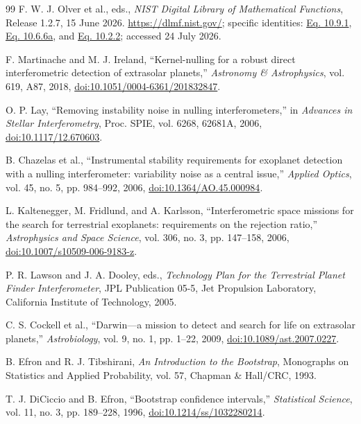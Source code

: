 \documentclass[12pt,a4paper]{article}
\numberwithin{equation}{section}
\numberwithin{figure}{section}
\numberwithin{table}{section}
\begin{document}
\begin{thebibliography}{99}
F. W. J. Olver et al., eds.,
\textit{NIST Digital Library of Mathematical Functions}, Release 1.2.7, 15 June 2026.
\url{https://dlmf.nist.gov/}; specific identities:
\href{https://dlmf.nist.gov/10.9.E1}{Eq. 10.9.1},
\href{https://dlmf.nist.gov/10.6.E6a}{Eq. 10.6.6a}, and
\href{https://dlmf.nist.gov/10.2.E2}{Eq. 10.2.2}; accessed 24 July 2026.

F. Martinache and M. J. Ireland,
``Kernel-nulling for a robust direct interferometric detection of extrasolar planets,''
\textit{Astronomy \& Astrophysics}, vol. 619, A87, 2018,
\href{https://doi.org/10.1051/0004-6361/201832847}{doi:10.1051/0004-6361/201832847}.

O. P. Lay,
``Removing instability noise in nulling interferometers,''
in \textit{Advances in Stellar Interferometry}, Proc. SPIE, vol. 6268, 62681A, 2006,
\href{https://doi.org/10.1117/12.670603}{doi:10.1117/12.670603}.

B. Chazelas et al.,
``Instrumental stability requirements for exoplanet detection with a nulling interferometer: variability noise as a central issue,''
\textit{Applied Optics}, vol. 45, no. 5, pp. 984--992, 2006,
\href{https://doi.org/10.1364/AO.45.000984}{doi:10.1364/AO.45.000984}.

L. Kaltenegger, M. Fridlund, and A. Karlsson,
``Interferometric space missions for the search for terrestrial exoplanets: requirements on the rejection ratio,''
\textit{Astrophysics and Space Science}, vol. 306, no. 3, pp. 147--158, 2006,
\href{https://doi.org/10.1007/s10509-006-9183-z}{doi:10.1007/s10509-006-9183-z}.

P. R. Lawson and J. A. Dooley, eds.,
\textit{Technology Plan for the Terrestrial Planet Finder Interferometer},
JPL Publication 05-5, Jet Propulsion Laboratory, California Institute of Technology, 2005.

C. S. Cockell et al.,
``Darwin---a mission to detect and search for life on extrasolar planets,''
\textit{Astrobiology}, vol. 9, no. 1, pp. 1--22, 2009,
\href{https://doi.org/10.1089/ast.2007.0227}{doi:10.1089/ast.2007.0227}.

B. Efron and R. J. Tibshirani,
\textit{An Introduction to the Bootstrap},
Monographs on Statistics and Applied Probability, vol. 57, Chapman \& Hall/CRC, 1993.

T. J. DiCiccio and B. Efron,
``Bootstrap confidence intervals,''
\textit{Statistical Science}, vol. 11, no. 3, pp. 189--228, 1996,
\href{https://doi.org/10.1214/ss/1032280214}{doi:10.1214/ss/1032280214}.


\end{thebibliography}
\end{document}
